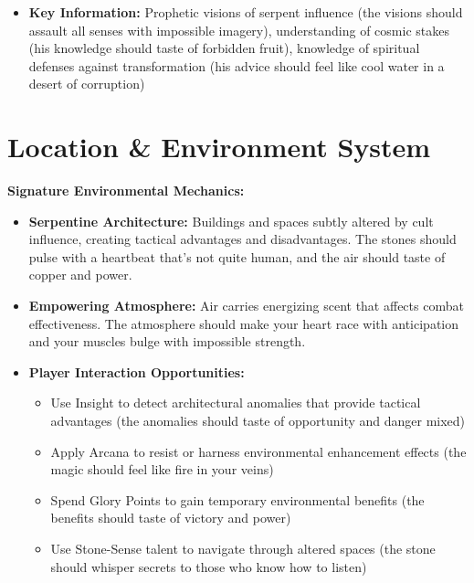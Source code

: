 \documentclass[11pt]{article}
\begin{document}
\begin{itemize}
\begin{itemize}
  \item \textbf{Key Information:} Prophetic visions of serpent influence (the visions should assault all senses with impossible imagery), understanding of cosmic stakes (his knowledge should taste of forbidden fruit), knowledge of spiritual defenses against transformation (his advice should feel like cool water in a desert of corruption)
  \end{itemize}
\end{itemize}

\section{Location \& Environment System}

\textbf{Signature Environmental Mechanics:}
\begin{itemize}
\item \textbf{Serpentine Architecture:} Buildings and spaces subtly altered by cult influence, creating tactical advantages and disadvantages. The stones should pulse with a heartbeat that's not quite human, and the air should taste of copper and power.
\item \textbf{Empowering Atmosphere:} Air carries energizing scent that affects combat effectiveness. The atmosphere should make your heart race with anticipation and your muscles bulge with impossible strength.
\item \textbf{Player Interaction Opportunities:}
  \begin{itemize}
  \item Use Insight to detect architectural anomalies that provide tactical advantages (the anomalies should taste of opportunity and danger mixed)
  \item Apply Arcana to resist or harness environmental enhancement effects (the magic should feel like fire in your veins)
  \item Spend Glory Points to gain temporary environmental benefits (the benefits should taste of victory and power)
  \item Use Stone-Sense talent to navigate through altered spaces (the stone should whisper secrets to those who know how to listen)
  \end{itemize}
\end{itemize}
\end{document}
